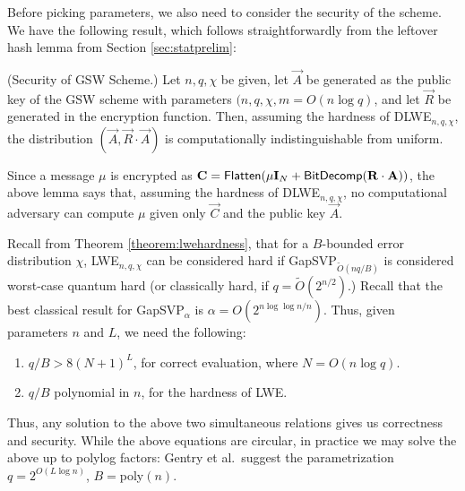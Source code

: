     Before picking parameters, we also need to consider the security of the scheme. We have the following result, which follows straightforwardly from the leftover hash lemma from Section \ref{sec:statprelim}:
    \begin{theorem} (Security of GSW Scheme.)
        Let $n, q, \chi$ be given, let $\vec{A}$ be generated as the public key of the GSW scheme with parameters $(n, q, \chi, m = O(n \log q)$, and let $\vec{R}$ be generated in the encryption function.
        Then, assuming the hardness of DLWE$_{n, q, \chi}$, the distribution $(\vec{A}, \vec{R} \cdot \vec{A})$ is computationally indistinguishable from uniform.
    \end{theorem}

    Since a message $\mu$ is encrypted as $\vec{C} = {\sf Flatten}(\mu \vec{I}_N + {\sf BitDecomp}(\vec{R} \cdot \vec{A}))$, the above lemma says that, assuming the hardness of DLWE$_{n, q, \chi}$, no computational adversary can compute $\mu$ given only $\vec{C}$ and the public key $\vec{A}$.

    Recall from Theorem \ref{theorem:lwehardness}, that for a $B$-bounded error distribution $\chi$, LWE$_{n, q, \chi}$ can be considered hard if GapSVP$_{\widetilde{O}(nq/B)}$ is considered worst-case quantum hard (or classically hard, if $q = \widetilde{O}(2^{n/2})$.) Recall that the best classical result for GapSVP$_{\alpha}$ is $\alpha = O(2^{n \log \log n / n}).$ Thus, given parameters $n$ and $L$, we need the following:
    \begin{enumerate}
        \item $q/B > 8(N+1)^L$, for correct evaluation, where $N = O(n \log q)$.
        \item $q/B$ polynomial in $n$, for the hardness of LWE.
    \end{enumerate}

    Thus, any solution to the above two simultaneous relations gives us correctness and security. While the above equations are circular, in practice we may solve the above up to polylog factors: Gentry et al.~suggest the parametrization $q = 2^{O(L \log n)}$, $B = $poly$(n)$.

